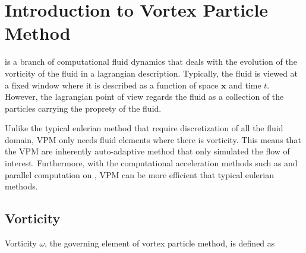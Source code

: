 


\section{Introduction to Vortex Particle Method}
 is a branch of computational fluid dynamics that deals with the evolution of the vorticity of the fluid in a lagrangian description. Typically, the fluid is viewed at a fixed window where it is described as a function of space $\mathbf{x}$ and time $t$. However, the lagrangian point of view regards the fluid as a collection of the particles carrying the proprety of the fluid. 


Unlike the typical eulerian method that require discretization of all the fluid domain, VPM only needs fluid elements where there is vorticity. This means that the VPM are inherently auto-adaptive method that only simulated the flow of interest. Furthermore, with the computational acceleration methods such as  and parallel computation on , VPM can be more efficient that typical eulerian methods.

\subsection{Vorticity}
Vorticity $\omega$, the governing element of vortex particle method, is defined as

